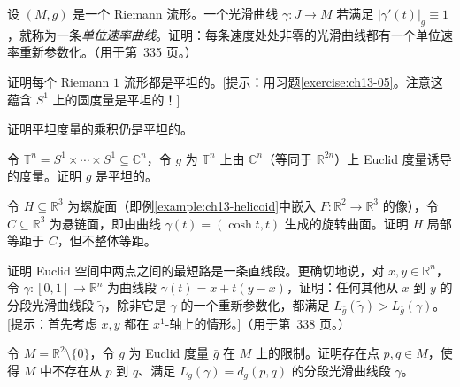 \documentclass[../../main.tex]{subfiles}
\begin{document}
\begin{exercise}\label{exercise:ch13-05}
设 $(M,g)$ 是一个 Riemann 流形。一个光滑曲线 $\gamma:J\to M$ 若满足 $|\gamma'(t)|_g\equiv1$，就称为一条\emph{单位速率曲线}。证明：每条速度处处非零的光滑曲线都有一个单位速率重新参数化。（用于第~335 页。）
\end{exercise}

\begin{exercise}\label{exercise:ch13-06}
证明每个 Riemann $1$ 流形都是平坦的。[提示：用习题\ref{exercise:ch13-05}。注意这蕴含 $S^1$ 上的圆度量是平坦的！]
\end{exercise}

\begin{exercise}\label{exercise:ch13-07b}
证明平坦度量的乘积仍是平坦的。
\end{exercise}

\begin{exercise}\label{exercise:ch13-08}
令 $\mathbb{T}^n=S^1\times\cdots\times S^1\subseteq\mathbb{C}^n$，令 $g$ 为 $\mathbb{T}^n$ 上由 $\mathbb{C}^n$（等同于 $\mathbb{R}^{2n}$）上 Euclid 度量诱导的度量。证明 $g$ 是平坦的。
\end{exercise}

\begin{exercise}\label{exercise:ch13-09}
令 $H\subseteq\mathbb{R}^3$ 为螺旋面（即例\ref{example:ch13-helicoid}中嵌入 $F:\mathbb{R}^2\to\mathbb{R}^3$ 的像），令 $C\subseteq\mathbb{R}^3$ 为悬链面，即由曲线 $\gamma(t)=(\cosh t,t)$ 生成的旋转曲面。证明 $H$ 局部等距于 $C$，但不整体等距。
\end{exercise}

\begin{exercise}\label{exercise:ch13-10}
证明 Euclid 空间中两点之间的最短路是一条直线段。更确切地说，对 $x,y\in\mathbb{R}^n$，令 $\gamma:[0,1]\to\mathbb{R}^n$ 为曲线段 $\gamma(t)=x+t(y-x)$，证明：任何其他从 $x$ 到 $y$ 的分段光滑曲线段 $\widetilde\gamma$，除非它是 $\gamma$ 的一个重新参数化，都满足 $L_{\bar g}(\widetilde\gamma)>L_{\bar g}(\gamma)$。[提示：首先考虑 $x,y$ 都在 $x^1$-轴上的情形。]（用于第~338 页。）
\end{exercise}

\begin{exercise}\label{exercise:ch13-11}
令 $M=\mathbb{R}^2\setminus\{0\}$，令 $g$ 为 Euclid 度量 $\bar g$ 在 $M$ 上的限制。证明存在点 $p,q\in M$，使得 $M$ 中不存在从 $p$ 到 $q$、满足 $L_g(\gamma)=d_g(p,q)$ 的分段光滑曲线段 $\gamma$。
\end{exercise}
\end{document}
